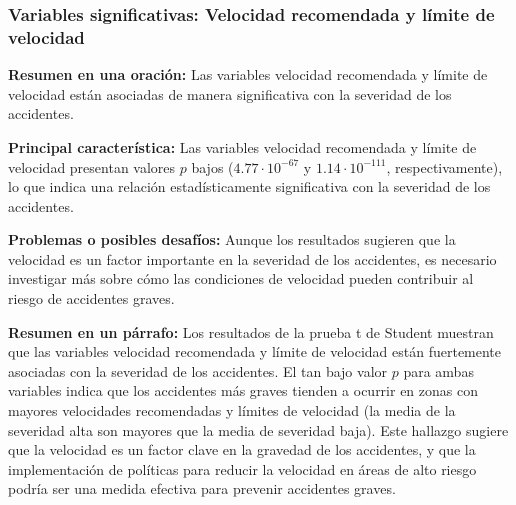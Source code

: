 \documentclass{book}
\begin{document}
\subsubsection{Variables significativas: Velocidad recomendada y límite de velocidad}
\textbf{Resumen en una oración:} Las variables velocidad recomendada y límite de velocidad están asociadas de manera significativa con la severidad de los accidentes.

\textbf{Principal característica:} Las variables velocidad recomendada y límite de velocidad presentan valores $p$ bajos ($4.77 \cdot 10^{-67}$ y $1.14 \cdot 10^{-111}$, respectivamente), lo que indica una relación estadísticamente significativa con la severidad de los accidentes.

\textbf{Problemas o posibles desafíos:} Aunque los resultados sugieren que la velocidad es un factor importante en la severidad de los accidentes, es necesario investigar más sobre cómo las condiciones de velocidad pueden contribuir al riesgo de accidentes graves.

\textbf{Resumen en un párrafo:} 
Los resultados de la prueba t de Student muestran que las variables velocidad recomendada y límite de velocidad están fuertemente asociadas con la severidad de los accidentes. El tan bajo valor $p$ para ambas variables indica que los accidentes más graves tienden a ocurrir en zonas con mayores velocidades recomendadas y límites de velocidad (la media de la severidad alta son mayores que la media de severidad baja). Este hallazgo sugiere que la velocidad es un factor clave en la gravedad de los accidentes, y que la implementación de políticas para reducir la velocidad en áreas de alto riesgo podría ser una medida efectiva para prevenir accidentes graves.




\nocite{*}
\end{document}
